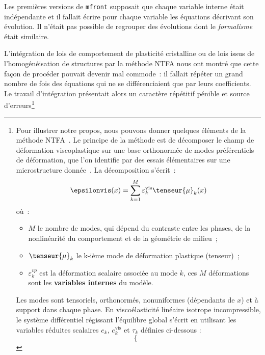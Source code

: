 \documentclass[rectoverso,pleiades,pstricks,leqno,anti]{texmf/note_technique_2010}
\newcommand{\mfront}{\texttt{mfront}}
\begin{document}
Les premières versions de \mfront{} supposait que chaque variable
interne était indépendante et il fallait écrire pour chaque variable les
équations décrivant son évolution. Il n'était pas possible de regrouper
des évolutions dont le {\em formalisme} était similaire.

L'intégration de lois de comportement de plasticité cristalline ou de
lois issus de l'homogénéisation de structures par la méthode
NTFA nous ont montré que cette façon de procéder pouvait devenir mal
commode~: il fallait répéter un grand nombre de fois des équations qui
ne se différenciaient que par leurs coefficients. Le travail
d'intégration présentait alors un caractère répétitif pénible et source
d'erreurs\footnote{Pour illustrer notre propos, nous pouvons donner quelques
  éléments de la méthode NTFA~\cite{blanc:ver}. Le principe de la méthode
  est de décomposer le champ de déformation viscoplastique sur une base
  orthonormée de modes préférentiels de déformation, que l'on identifie
  par des essais élémentaires sur une microstructure
  donnée~\cite{largenton12:_model_mox}. La décomposition s'écrit~:
  \begin{equation}
    \label{eq:decoeps} \epsilonvis(x) = \sum_{k=1}^M \varepsilon^{\mathrm{vis}}_k
    \tenseur{\mu}_k(x)
  \end{equation}
  où~:
  \begin{minipage}[t]{0.9\linewidth}
    \begin{itemize} \item \(M\) le nombre de modes, qui dépend du
      contraste entre les phases, de la nonlinéarité du comportement et
      de la géométrie de milieu~; \item \(\tenseur{\mu}_k\) le k-ième
      mode de déformation plastique (tenseur)~; \item
      \(\varepsilon^{vp}_k\) est la déformation scalaire associée au
      mode \(k\), ces \(M\) déformations sont les {\bf variables
      internes} du modèle.
  \end{itemize}
\end{minipage} \medskip Les modes sont tensoriels, orthonormés,
nonuniformes (dépendants de \(x\)) et à support dans chaque phase. En
viscoélasticité linéaire isotrope incompressible, le système
différentiel régissant l'équilibre global s'écrit en utilisant les
variables réduites scalaires \(e_k\), \(e_k^{\mathrm{vis}}\) et
\(\tau_k\) définies ci-dessous :
\begin{equation}
  \label{eq:modeleeffectif} \displaystyle \left\{
  \begin{array}{rcl}

\end{array}
\end{equation}}
\end{document}
